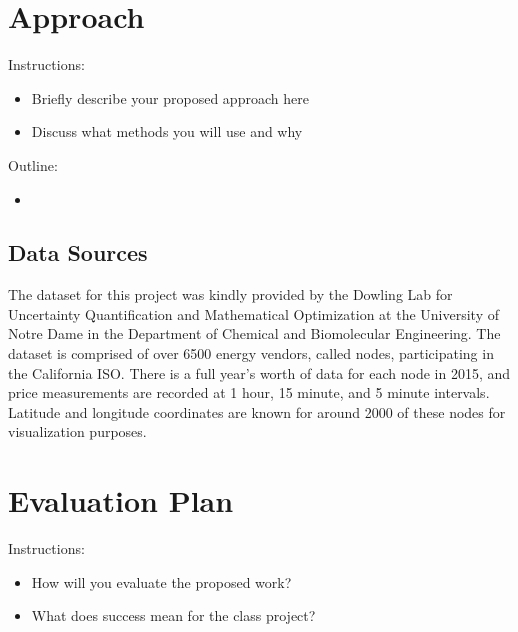 \documentclass[sigconf]{acmart}
\begin{document}
\section{Approach}
Instructions:
\begin{itemize}
    \item Briefly describe your proposed approach here
    \item Discuss what methods you will use and why
\end{itemize}

Outline:
\begin{itemize}
	\item 
\end{itemize}


\subsection{Data Sources}
The dataset for this project was kindly provided by the Dowling Lab for Uncertainty Quantification and Mathematical Optimization at the University of Notre Dame in the Department of Chemical and Biomolecular Engineering. The dataset is comprised of over 6500 energy vendors, called nodes, participating in the California ISO. There is a full year's worth of data for each node in 2015, and price measurements are recorded at 1 hour, 15 minute, and 5 minute intervals. Latitude and longitude coordinates are known for around 2000 of these nodes for visualization purposes. 


\section{Evaluation Plan}

Instructions:
\begin{itemize}
    \item How will you evaluate the proposed work?
    \item What does success mean for the class project?
\end{itemize}
\end{document}

